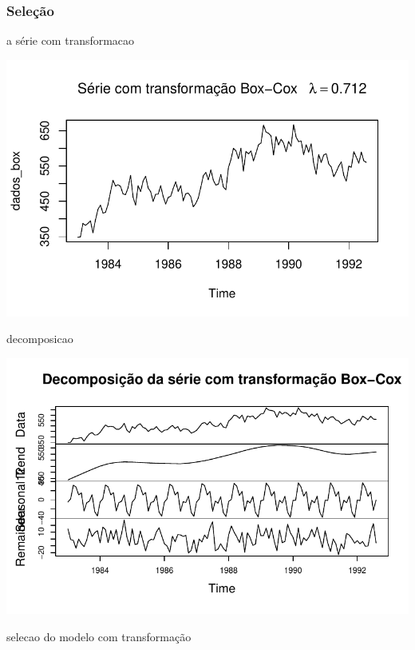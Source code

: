 \documentclass[
  letterpaper,
  DIV=11,
  numbers=noendperiod]{scrartcl}
\begin{document}
\hypertarget{seleuxe7uxe3o-3}{%
\subsubsection{Seleção}\label{seleuxe7uxe3o-3}}

a série com transformacao

\includegraphics{T2_grupo5_files/figure-pdf/ETS-com-transf-1.pdf}

decomposicao

\includegraphics{T2_grupo5_files/figure-pdf/decomposicao-ets-com-transformacao-1.pdf}

selecao do modelo com transformação
\end{document}
